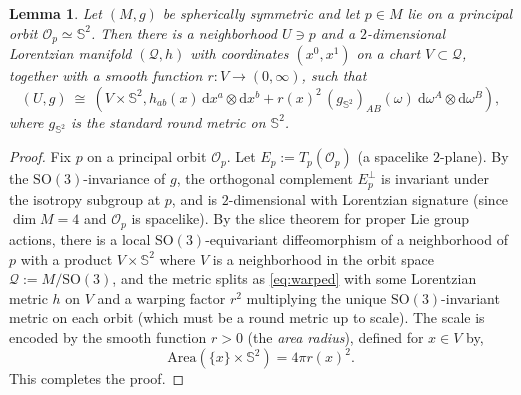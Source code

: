 \documentclass[a4paper, reqno]{amsart}
\numberwithin{equation}{section}
\theoremstyle{plain}
\newtheorem{lemma}[theorem]{Lemma}
\theoremstyle{definition}
\theoremstyle{remark}
\newcommand{\dd}{\mathrm{d}}
\begin{document}
\begin{lemma}\label{lem:warped}
Let $(M,g)$ be spherically symmetric and let $p\in M$ lie on a principal orbit $\mathcal O_p\simeq \mathbb S^2$. Then there is a neighborhood $U\ni p$ and a $2$-dimensional Lorentzian manifold $(\mathcal Q,h)$ with coordinates $(x^0,x^1)$ on a chart $V\subset\mathcal Q$, together with a smooth function $r:V\to(0,\infty)$, such that
\begin{equation}\label{eq:warped}
(U,g)\ \cong\ (V\times \mathbb S^2, h_{ab}(x)\,\dd x^a \otimes \dd x^b + r(x)^2\,(g_{\mathbb{S}^2})_{AB}(\omega)\ \dd\omega^A \otimes  \dd\omega^B), 
\end{equation}
where $g_{\mathbb{S}^2}$ is the standard round metric on $\mathbb S^2$.
\end{lemma}
\begin{proof}
Fix $p$ on a principal orbit $\mathcal O_p$. Let $E_p:=T_p(\mathcal O_p)$ (a spacelike $2$-plane). By the $\mathrm{SO}(3)$-invariance of $g$, the orthogonal complement $E_p^\perp$ is invariant under the isotropy subgroup at $p$, and is $2$-dimensional with Lorentzian signature (since $\dim M=4$ and $\mathcal O_p$ is spacelike). By the slice theorem for proper Lie group actions, there is a local $\mathrm{SO}(3)$-equivariant diffeomorphism of a neighborhood of $p$ with a product $V\times \mathbb S^2$
where $V$ is a neighborhood in the orbit space $\mathcal Q:=M/\mathrm{SO}(3)$, and the metric splits as \eqref{eq:warped} with some Lorentzian metric $h$ on $V$ and a warping factor $r^2$ multiplying the unique $\mathrm{SO}(3)$-invariant metric on each orbit (which must be a round metric up to scale). The scale is encoded by the smooth function $r>0$ (the \emph{area radius}), defined for $x\in V$ by,
$$\mathrm{Area}(\{x\}\times \mathbb S^2)=4\pi r(x)^2.$$
This completes the proof.

\end{proof}
\end{document}
